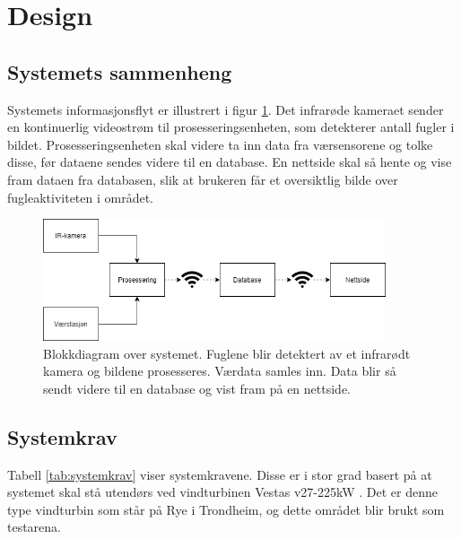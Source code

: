 \section{Design}\label{sec:design}
\subsection{Systemets sammenheng}\label{sec:design:sammenheng}

Systemets informasjonsflyt er illustrert i figur \ref{fig:blokkDig}. 
Det infrarøde kameraet sender en kontinuerlig videostrøm til prosesseringsenheten, som detekterer antall fugler i bildet. 
Prosesseringsenheten skal videre ta inn data fra værsensorene og tolke disse, før dataene sendes videre til en database. 
En nettside skal så hente og vise fram dataen fra databasen, slik at brukeren får et oversiktlig bilde over fugleaktiviteten i området. 

\begin{figure}[H]
    \centering
    \includegraphics[width=0.9\textwidth]{design/designflytskjema.png}
    \caption{Blokkdiagram over systemet. Fuglene blir detektert av et infrarødt kamera og bildene prosesseres. Værdata samles inn. Data blir så sendt videre til en database og vist fram på en nettside.}
    \label{fig:blokkDig}
\end{figure}

\newpage
\subsection{Systemkrav}\label{sec:design:systemkrav}
Tabell \ref{tab:systemkrav} viser systemkravene. 
Disse er i stor grad basert på at systemet skal stå utendørs ved vindturbinen Vestas v27-225kW \cite{vindturbin}.
Det er denne type vindturbin som står på Rye i Trondheim, og dette området blir brukt som testarena. 




